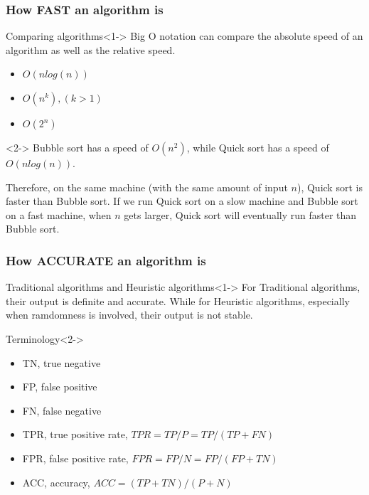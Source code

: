 \documentclass[UTF8]{beamer}
\begin{document}
	\begin{frame}
	    \frametitle{How FAST an algorithm is}
		\begin{block}{Comparing algorithms}<1->
			Big O notation can compare the absolute speed of an algorithm as well as the relative speed.
			\begin{itemize}
				\item $O(n log(n))$
				\item $O(n^k),(k>1)$
				\item $O(2^n)$
			\end{itemize}
		\end{block}
		\begin{example}<2->
			Bubble sort has a speed of $O(n^2)$, while Quick sort has a speed of $O(n log(n))$.

			Therefore, on the same machine (with the same amount of input $n$), Quick sort is faster than Bubble sort.
			If we run Quick sort on a slow machine and Bubble sort on a fast machine, when $n$ gets larger, Quick sort will \alert{eventually run faster} than Bubble sort.
		\end{example}
    \end{frame}

	\begin{frame}
	    \frametitle{How ACCURATE an algorithm is}
		\begin{block}{Traditional algorithms and Heuristic algorithms}<1->
			For Traditional algorithms, their output is definite and accurate.
			While for Heuristic algorithms, especially when ramdomness is involved, their output is not stable.
		\end{block}
		\begin{block}{Terminology}<2->
			\begin{itemize}
				\item TN, true negative
				\item FP, false positive
				\item FN, false negative
				\item TPR, true positive rate, $TPR = TP / P = TP / (TP+FN)$
				\item FPR, false positive rate, $FPR = FP / N = FP / (FP + TN)$
				\item ACC, accuracy, $ACC = (TP + TN) / (P + N)$
			\end{itemize}
		\end{block}
    \end{frame}
\end{document}
